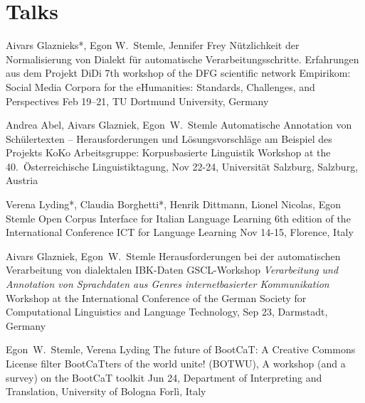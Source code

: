 \documentclass[11pt,a4paper]{moderncv}
\begin{document}
\closesection{}


\section{Talks}
        {Aivars Glaznieks*, Egon W.~Stemle, Jennifer Frey}
        {\small Nützlichkeit der Normalisierung von Dialekt für automatische
         Verarbeitungsschritte. Erfahrungen aus dem Projekt DiDi}
        {\small 7th workshop of the DFG scientific network Empirikom: Social
        Media Corpora for the eHumanities: Standards, Challenges, and
        Perspectives}
        {\small Feb 19–21, TU Dortmund University, Germany}
        {}

        {Andrea Abel, Aivars Glazniek, Egon~W.~Stemle}
        {\small Automatische Annotation von Schülertexten -- Herausforderungen
        und Lösungsvorschläge am Beispiel des Projekts KoKo}
        {\small Arbeitsgruppe: Korpusbasierte Linguistik} 
        {\small Workshop at the 40.~Österreichische Linguistiktagung, Nov
        22-24, Universität Salzburg, Salzburg, Austria}
        {}

        {Verena Lyding*, Claudia Borghetti*, Henrik Dittmann, Lionel Nicolas, Egon Stemle}
        {\small Open Corpus Interface for Italian Language Learning}
        {\small 6th edition of the International Conference ICT for Language Learning}
        {\small Nov 14-15, Florence, Italy}
        {}

        {Aivars Glazniek, Egon~W.~Stemle}
        {\small Herausforderungen bei der automatischen Verarbeitung von dialektalen IBK-Daten}
        {\small GSCL-Workshop \emph{Verarbeitung und Annotation von Sprachdaten aus
        Genres internetbasierter Kommunikation}}
        {\small Workshop at the International Conference of the German Society
        for Computational Linguistics and Language Technology, Sep 23,
        Darmstadt, Germany}
        {}

        {Egon~W.~Stemle, Verena Lyding}
        {\small The future of BootCaT: A Creative Commons License filter}
        {\small BootCaTters of the world unite! (BOTWU), A workshop (and a
        survey) on the BootCaT toolkit}
        {\small Jun 24, Department of Interpreting and Translation, University
        of Bologna Forl\`{i}, Italy}
        {}
\end{document}

